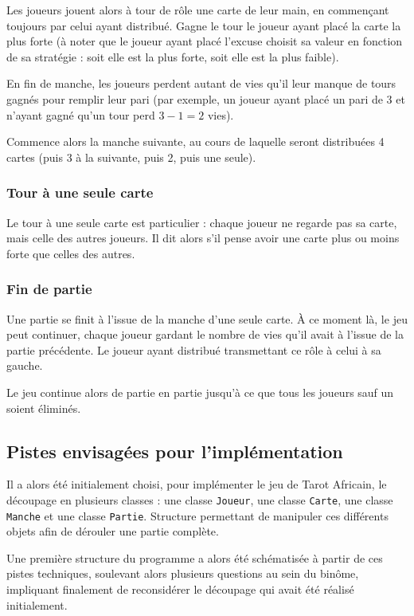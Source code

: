          Les joueurs jouent alors à tour de rôle une carte de leur main, en commençant toujours par celui ayant distribué.
         Gagne le tour le joueur ayant placé la carte la plus forte (à noter que le joueur ayant placé l'excuse choisit sa valeur en fonction de sa stratégie : soit elle est la plus forte, soit elle est la plus faible).

         En fin de manche, les joueurs perdent autant de vies qu'il leur manque de tours gagnés pour remplir leur pari (par exemple, un joueur ayant placé un pari de 3 et n'ayant gagné qu'un tour perd $3-1 = 2$ vies).

         Commence alors la manche suivante, au cours de laquelle seront distribuées 4 cartes (puis 3 à la suivante, puis 2, puis une seule).
      \subsubsection{Tour à une seule carte}
         Le tour à une seule carte est particulier : chaque joueur ne regarde pas sa carte, mais celle des autres joueurs.
         Il dit alors s'il pense avoir une carte plus ou moins forte que celles des autres.
      \subsubsection{Fin de partie}
         Une partie se finit à l'issue de la manche d'une seule carte.
         À ce moment là, le jeu peut continuer, chaque joueur gardant le nombre de vies qu'il avait à l'issue de la partie précédente.
         Le joueur ayant distribué transmettant ce rôle à celui à sa gauche.

         Le jeu continue alors de partie en partie jusqu'à ce que tous les joueurs sauf un soient éliminés.

   \subsection{Pistes envisagées pour l'implémentation}\label{subsec:pistes-envisagées-pour-l'implémentation}
      Il a alors été initialement choisi, pour implémenter le jeu de Tarot Africain, le découpage en plusieurs classes : une classe \texttt{Joueur}, une classe \texttt{Carte}, une classe \texttt{Manche} et une classe \texttt{Partie}.
      Structure permettant de manipuler ces différents objets afin de dérouler une partie complète.

      Une première structure du programme a alors été schématisée à partir de ces pistes techniques, soulevant alors plusieurs questions au sein du binôme, impliquant finalement de reconsidérer le découpage qui avait été réalisé initialement.

